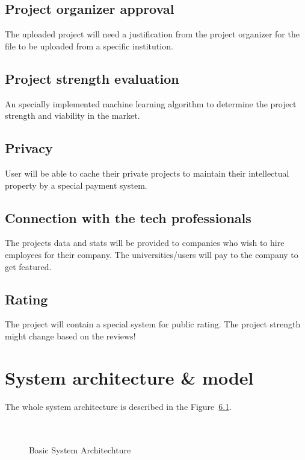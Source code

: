 \documentclass{scrreprt}
\begin{document}
\section{Project organizer approval} 
The uploaded project will need a justification from the project organizer for the file to be uploaded from a specific institution.
\section{Project strength evaluation}
An specially implemented machine learning algorithm to determine the project strength and viability in the market.
\section{Privacy} 
User will be able to cache their private projects to maintain their intellectual property by a special payment system.
\section{Connection with the tech professionals}
The projects data and stats will be provided to companies who wish to hire employees for their company. The universities/users will pay to the company to get featured.
\section{Rating}
The project will contain a special system for public rating. The project strength might change based on the reviews!

\chapter{System architecture \& model}
The whole system architecture is described in the Figure~\ref{Requirements}.\\\\\\
\begin{figure}[ht]
\begin{center}
\end{center}
\caption{Basic System Architechture\label{Requirements}}
\end{figure}
\end{document}

